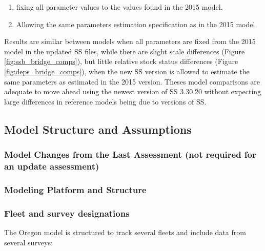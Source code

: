 \documentclass[11pt,
  english,
  letterpaper,
]{article}
\providecommand{\tightlist}{%
  \setlength{\itemsep}{0pt}\setlength{\parskip}{0pt}}
\providecommand{\tightlist}{%
  \setlength{\itemsep}{0pt}\setlength{\parskip}{0pt}}
\begin{document}
\begin{enumerate}
\def\labelenumi{\arabic{enumi})}
\tightlist
\item
  fixing all parameter values to the values found in the 2015 model.
\item
  Allowing the same parameters estimation specification as in the 2015 model
\end{enumerate}

Results are similar between models when all parameters are fixed from the 2015 model in the updated SS files, while there are slight scale differences (Figure \ref{fig:ssb_bridge_comps}), but little relative stock status differences (Figure \ref{fig:deps_bridge_comps}), when the new SS version is allowed to estimate the same parameters as estimated in the 2015 version. Theses model comparisons are adequate to move ahead using the newest version of SS 3.30.20 without expecting large differences in reference models being due to versions of SS.

\hypertarget{model-structure-and-assumptions}{%
\subsection{Model Structure and Assumptions}\label{model-structure-and-assumptions}}

\hypertarget{model-changes-from-the-last-assessment-not-required-for-an-update-assessment}{%
\subsubsection{Model Changes from the Last Assessment (not required for an update assessment)}\label{model-changes-from-the-last-assessment-not-required-for-an-update-assessment}}

\hypertarget{modeling-platform-and-structure}{%
\subsubsection{Modeling Platform and Structure}\label{modeling-platform-and-structure}}

\hypertarget{fleet-and-survey-designations}{%
\subsubsection{Fleet and survey designations}\label{fleet-and-survey-designations}}

The Oregon model is structured to track several fleets and include data from several surveys:
\end{document}
